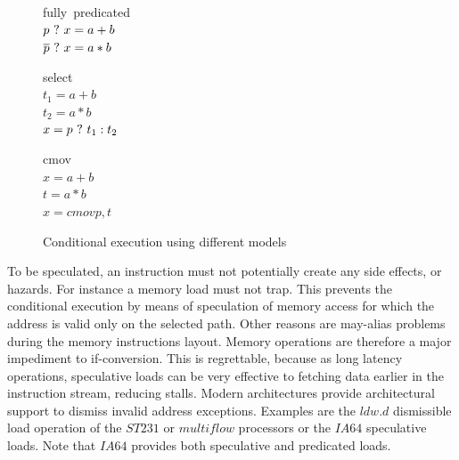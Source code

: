 \begin{figure}
\footnotesize
\begin{minipage}[t]{3cm}
\mbox{fully predicated} \\
$p ~?~ x = a + b $ \\
$\overline{p} ~?~ x = a * b $ \\
\end{minipage} 
\begin{minipage}[t]{3cm}
\mbox{select} \\
$t_1 = a + b $ \\
$t_2 = a * b $ \\
$x= p ~?~ t_1 : t_2 $ \\
\end{minipage}
\begin{minipage}[t]{3cm}
\mbox{cmov} \\
$x = a + b $ \\
$t = a * b $ \\
$x = cmov p,t$ \\
\end{minipage}
\caption{Conditional execution using different models}
\label{fig:pred}
\end{figure}

To be speculated, an instruction must not potentially create any side effects, or hazards. For instance a memory load must not trap. This prevents the conditional execution by means of speculation of memory access for which the address is valid only on the selected path. Other reasons are may-alias problems during the memory instructions layout. Memory operations are therefore a major impediment to if-conversion. This is regrettable, because as long latency operations, speculative loads can be very effective to fetching data earlier in the instruction stream, reducing stalls. Modern architectures provide architectural support to dismiss invalid address exceptions. Examples are the $ldw.d$ dismissible load operation of the $ST231$ or $multiflow$ processors or the $IA64$ speculative loads. Note that $IA64$ provides both speculative and predicated loads.

